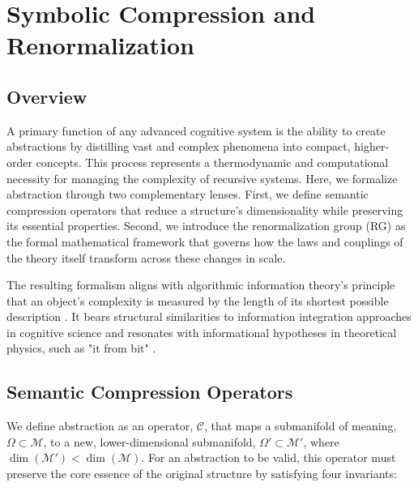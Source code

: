 \chapter{Symbolic Compression and Renormalization}
\label{15:symbolic_compression_and_renormalization}


\section{Overview}
\label{15.1:overview}

A primary function of any advanced cognitive system is the ability to create abstractions by distilling vast and complex phenomena into compact, higher-order concepts. This process represents a thermodynamic and computational necessity for managing the complexity of recursive systems. Here, we formalize abstraction through two complementary lenses. First, we define semantic compression operators that reduce a structure's dimensionality while preserving its essential properties. Second, we introduce the renormalization group (RG) as the formal mathematical framework that governs how the laws and couplings of the theory itself transform across these changes in scale.

The resulting formalism aligns with algorithmic information theory's principle that an object's complexity is measured by the length of its shortest possible description \autocite{Kolmogorov1965, Chaitin1966}. It bears structural similarities to information integration approaches in cognitive science \autocite{Tononi2004} and resonates with informational hypotheses in theoretical physics, such as "it from bit" \autocite{Wheeler1990}.


\section{Semantic Compression Operators}
\label{15.2:semantic_compression_operators}

We define abstraction as an operator, \(\mathcal{C}\), that maps a submanifold of meaning, \(\Omega \subset \mathcal{M}\), to a new, lower-dimensional submanifold, \(\Omega' \subset \mathcal{M}'\), where \(\dim(\mathcal{M}') < \dim(\mathcal{M})\). For an abstraction to be valid, this operator must preserve the core essence of the original structure by satisfying four invariants:

